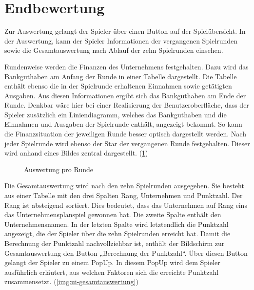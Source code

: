 \section{Endbewertung}
\label{sec:ui-endbewertung}

Zur Auswertung gelangt der Spieler über einen Button auf der Spielübersicht. In der Auswertung, kann der Spieler Informationen der vergangenen Spielrunden sowie die Gesamtauswertung nach Ablauf der zehn Spielrunden einsehen.
 
Rundenweise werden die Finanzen des Unternehmens festgehalten. Dazu wird das Bankguthaben am Anfang der Runde in einer Tabelle dargestellt. Die Tabelle enthält ebenso die in der Spielrunde erhaltenen Einnahmen sowie getätigten Ausgaben. Aus diesen Informationen ergibt sich das Bankguthaben am Ende der Runde. Denkbar wäre hier bei einer Realisierung der Benutzeroberfläche, dass der Spieler zusätzlich ein Liniendiagramm, welches das Bankguthaben und die Einnahmen und Ausgaben der Spielrunde enthält, angezeigt bekommt. So kann die Finanzsituation der jeweiligen Runde besser optisch dargestellt werden. Nach jeder Spielrunde wird ebenso der Star der vergangenen Runde festgehalten. Dieser wird anhand eines Bildes zentral dargestellt. (\ref{img:ui-auswertung})

\begin{figure}[htb]
  \centering
  \caption{Auswertung pro Runde}
  \label{img:ui-auswertung}
\end{figure}
 
Die Gesamtauswertung wird nach den zehn Spielrunden ausgegeben. Sie besteht aus einer Tabelle mit den drei Spalten Rang, Unternehmen und Punktzahl.  Der Rang ist absteigend sortiert. Dies bedeutet, dass das Unternehmen auf Rang eins das Unternehmensplanspiel gewonnen hat. Die zweite Spalte enthält den Unternehmensnamen. In der letzten Spalte wird letztendlich die Punktzahl angezeigt, die der Spieler über die zehn Spielrunden erreicht hat. Damit die Berechnung der Punktzahl nachvollziehbar ist, enthält der Bildschirm zur Gesamtauswertung den Button „Berechnung der Punktzahl“. Über diesen Button gelangt der Spieler zu einem PopUp. In diesem PopUp wird dem Spieler ausführlich erläutert, aus welchen Faktoren sich die erreichte Punktzahl zusammensetzt. (\ref{img:ui-gesamtauswertung})

